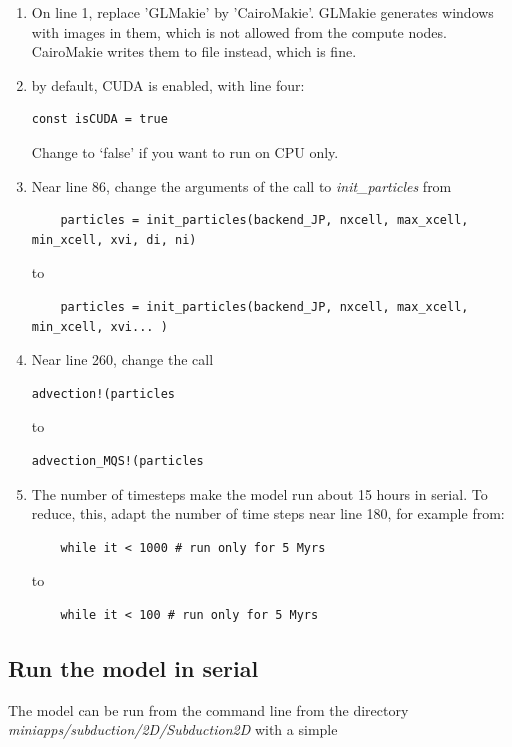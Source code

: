 \documentclass{article}
\begin{document}
\begin{enumerate}
\item On line 1, replace 'GLMakie' by 'CairoMakie'. GLMakie generates windows with images in them, 
which is not allowed from the compute nodes. CairoMakie writes them to file instead, which is fine.
\item by default, CUDA is enabled, with line four:
\begin{verbatim}
const isCUDA = true
\end{verbatim}
Change to `false' if you want to run on CPU only.
\item Near line 86, change the arguments of the call to \textit{init\_particles} from
\begin{verbatim}
    particles = init_particles(backend_JP, nxcell, max_xcell, min_xcell, xvi, di, ni)
\end{verbatim}
to
\begin{verbatim}
    particles = init_particles(backend_JP, nxcell, max_xcell, min_xcell, xvi... )
\end{verbatim}

\item Near line 260, change the call
\begin{verbatim}
advection!(particles
\end{verbatim}
to
\begin{verbatim}
advection_MQS!(particles
\end{verbatim}

\item The number of timesteps make the model run about 15 hours in serial.
To reduce, this, adapt the number of time steps near line 180, for example from:

\begin{verbatim}
    while it < 1000 # run only for 5 Myrs
\end{verbatim}
to
\begin{verbatim}
    while it < 100 # run only for 5 Myrs
\end{verbatim}

\end{enumerate}



\subsection{Run the model in serial}

The model can be run from the command line from the directory 
\textit{miniapps/subduction/2D/Subduction2D} with a simple
\end{document}
